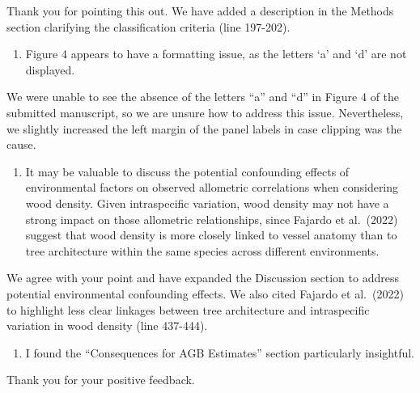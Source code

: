 \documentclass[
  12pt,
  letterpaper,
  DIV=11,
  numbers=noendperiod]{scrartcl}
\providecommand{\tightlist}{%
  \setlength{\itemsep}{0pt}\setlength{\parskip}{0pt}}\usepackage{longtable,booktabs,array}
\renewenvironment{quote}
  {\begin{customblockquote}\color{blockquote-text}\ignorespaces}
  {\end{customblockquote}}
\begin{document}
Thank you for pointing this out. We have added a description in the
Methods section clarifying the classification criteria (line 197-202).

\begin{quote}
\begin{enumerate}
\def\labelenumi{\arabic{enumi})}
\setcounter{enumi}{1}
\tightlist
\item
  Figure 4 appears to have a formatting issue, as the letters `a' and
  `d' are not displayed.
\end{enumerate}
\end{quote}

We were unable to see the absence of the letters ``a'' and ``d'' in
Figure 4 of the submitted manuscript, so we are unsure how to address
this issue. Nevertheless, we slightly increased the left margin of the
panel labels in case clipping was the cause.

\begin{quote}
\begin{enumerate}
\def\labelenumi{\arabic{enumi})}
\setcounter{enumi}{2}
\tightlist
\item
  It may be valuable to discuss the potential confounding effects of
  environmental factors on observed allometric correlations when
  considering wood density. Given intraspecific variation, wood density
  may not have a strong impact on those allometric relationships, since
  Fajardo et al.~(2022) suggest that wood density is more closely linked
  to vessel anatomy than to tree architecture within the same species
  across different environments.
\end{enumerate}
\end{quote}

We agree with your point and have expanded the Discussion section to
address potential environmental confounding effects. We also cited
Fajardo et al.~(2022) to highlight less clear linkages between tree
architecture and intraspecific variation in wood density (line 437-444).

\begin{quote}
\begin{enumerate}
\def\labelenumi{\arabic{enumi})}
\setcounter{enumi}{3}
\tightlist
\item
  I found the ``Consequences for AGB Estimates'' section particularly
  insightful.
\end{enumerate}
\end{quote}

Thank you for your positive feedback.
\end{document}
